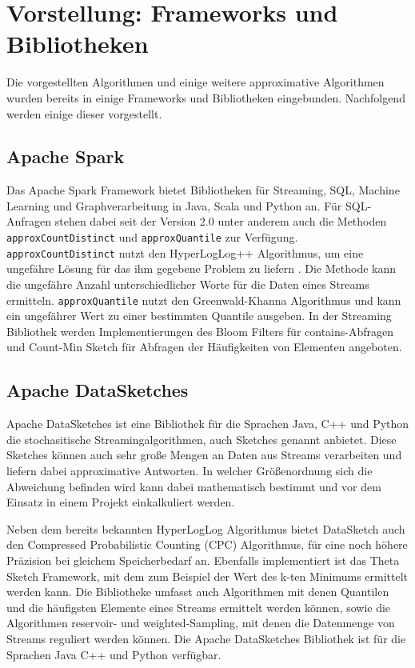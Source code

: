 \section{Vorstellung: Frameworks und Bibliotheken}
Die vorgestellten Algorithmen und einige weitere approximative Algorithmen wurden bereits in einige Frameworks und Bibliotheken eingebunden. Nachfolgend werden einige dieser vorgestellt.

\subsection{Apache Spark}
Das Apache Spark Framework bietet Bibliotheken für Streaming, SQL, Machine Learning und Graphverarbeitung in Java, Scala und Python an. 
Für SQL-Anfragen stehen dabei seit der Version 2.0 unter anderem auch die Methoden  \texttt{approxCountDistinct} 
und \texttt{approxQuantile} zur Verfügung. 
\texttt{approxCountDistinct} nutzt den HyperLogLog++ Algorithmus, 
um eine ungefähre Lösung für das ihm gegebene Problem zu liefern \cite{hunter2016}.
Die Methode kann die ungefähre Anzahl unterschiedlicher Worte für die Daten eines Streams ermitteln.
\texttt{approxQuantile} nutzt den Greenwald-Khanna Algorithmus \cite{greenwald2001} 
und kann ein ungefährer Wert zu einer bestimmten Quantile ausgeben.
In der Streaming Bibliothek werden Implementierungen des Bloom Filters für contains-Abfragen und Count-Min Sketch für Abfragen der Häufigkeiten von Elementen angeboten.


\subsection{Apache DataSketches}
Apache DataSketches ist eine Bibliothek für die Sprachen Java, C++ und Python die stochasitische Streamingalgorithmen, 
auch Sketches genannt anbietet. 
Diese Sketches können auch sehr große Mengen an Daten aus Streams verarbeiten 
und liefern dabei approximative Antworten. 
In welcher Größenordnung sich die Abweichung befinden wird kann dabei mathematisch bestimmt 
und vor dem Einsatz in einem Projekt einkalkuliert werden.

Neben dem bereits bekannten HyperLogLog Algorithmus bietet DataSketch auch den Compressed Probabilistic Counting (CPC) Algorithmus, 
für eine noch höhere Präzision bei gleichem Speicherbedarf an.
Ebenfalls implementiert ist das Theta Sketch Framework, 
mit dem zum Beispiel der Wert des k-ten Minimums ermittelt werden kann.
Die Bibliotheke umfasst auch Algorithmen mit denen Quantilen und die häufigsten Elemente eines Streams ermittelt werden können, 
sowie die Algorithmen reservoir- und weighted-Sampling, mit denen die Datenmenge von Streams reguliert werden können.
Die Apache DataSketches Bibliothek ist für die Sprachen Java C++ und Python verfügbar.

